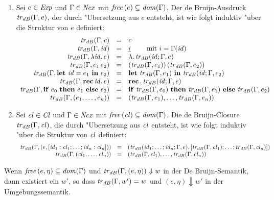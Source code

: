 \documentclass[12pt,fleqn,a4paper]{article}
\newcommand{\Cl}{\name{Cl}}
\newcommand{\cl}{\name{cl}}
\begin{document}
\begin{definition}["Ubersetzungsfunktion] \
  \begin{enumerate}
  \item Sei $e \in {\text{\it Exp\/}}$ und $\Gamma\in{\text{\it Ncx\/}}$ mit ${\text{\it free\/}}\,(e) \subseteq {\text{\it dom\/}}(\Gamma)$.
    Der de Bruijn-Ausdruck ${\text{\it tr\/}}_{dB}(\Gamma,e)$, der durch "Ubersetzung aus $e$ entsteht,
    ist wie folgt induktiv "uber die Struktur von $e$ definiert:
    \[\begin{array}{rcl}
      {\text{\it tr\/}}_{dB}(\Gamma,c) &=& c \\
      {\text{\it tr\/}}_{dB}(\Gamma,{\text{\it id\/}}) &=& \underline{i} \quad\quad \text{ mit } i = \Gamma({\text{\it id\/}}) \\
      {\text{\it tr\/}}_{dB}(\Gamma,\lambda {\text{\it id\/}}.\,e) &=& \lambda .\,{\text{\it tr\/}}_{dB}({\text{\it id\/}};\Gamma,e) \\
      {\text{\it tr\/}}_{dB}(\Gamma,e_1\,e_2) &=& ({\text{\it tr\/}}_{dB}(\Gamma,e_1))\,({\text{\it tr\/}}_{dB}(\Gamma,e_2)) \\
      {\text{\it tr\/}}_{dB}(\Gamma,\mathbf{let}\ {\text{\it id\/}} = e_1\ \mathbf{in}\ e_2) &=& \mathbf{let}\ {{\text{\it tr\/}}_{dB}(\Gamma,e_1)}\ \mathbf{in}\ {{\text{\it tr\/}}_{dB}({\text{\it id\/}};\Gamma,e_2)} \\
      {\text{\it tr\/}}_{dB}(\Gamma,\mathbf{rec}\,{\text{\it id\/}}.\,e) &=& \mathbf{rec}\,.\,{\text{\it tr\/}}_{dB}({\text{\it id\/}};\Gamma,e) \\
      {\text{\it tr\/}}_{dB}(\Gamma,\mathbf{if}\ e_0\ \mathbf{then}\ e_1\ \mathbf{else}\ e_2) &=& \mathbf{if}\ {\text{\it tr\/}}_{dB}(\Gamma,e_0)\ \mathbf{then}\ {\text{\it tr\/}}_{dB}(\Gamma,e_1)\ \mathbf{else}\ {\text{\it tr\/}}_{dB}(\Gamma,e_2) \\
      {\text{\it tr\/}}_{dB}(\Gamma,(e_1,\ldots,e_n)) &=& ({\text{\it tr\/}}_{dB}(\Gamma,e_1),\ldots,{\text{\it tr\/}}_{dB}(\Gamma,e_n)) \\
    \end{array}\]
  \item Sei $\cl \in \Cl$ und $\Gamma \in {\text{\it Ncx\/}}$ mit $\free{\cl} \subseteq \dom{\Gamma}$.
    Die de Bruijn-Closure $\trdB{\Gamma,\cl}$, die durch "Ubersetzung aus $\cl$ entsteht,
    ist wie folgt induktiv "uber die Struktur von $\cl$ definiert:
    \[\begin{array}{rcl}
      \trdB{\Gamma,(e,[\id_1:\cl_1;\ldots;\id_n:\cl_n])} &=& (\trdB{\id_1;\ldots;\id_n;\Gamma,e},[\trdB{\Gamma,\cl_1};\ldots;\trdB{\Gamma,\cl_n}]) \\
      \trdB{\Gamma,(\cl_1,\ldots,\cl_n)} &=& (\trdB{\Gamma,\cl_1},\ldots,\trdB{\Gamma,\cl_n}) \\
    \end{array}\]
  \end{enumerate}
\end{definition}

\begin{theorem}
  Wenn ${\text{\it free\/}}\,(e,\eta) \subseteq {\text{\it dom\/}}(\Gamma)$ und ${\text{\it tr\/}}_{dB}(\Gamma,(e,\eta)) \Downarrow w$ in der
  De Bruijn-Semantik, dann existiert ein $w'$, so dass ${\text{\it tr\/}}_{dB}(\Gamma,w') = w$ und
  $(e,\eta) \Downarrow w'$ in der Umgebungssemantik.
\end{theorem}
\end{document}
